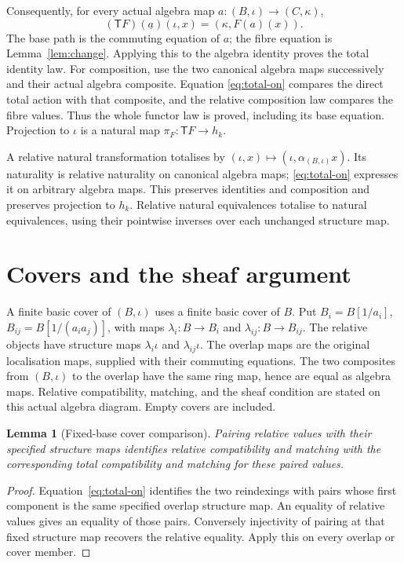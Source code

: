 \documentclass[11pt]{amsart}
\newtheorem{lemma}[theorem]{Lemma}
\theoremstyle{definition}\newtheorem{definition}[theorem]{Definition}
\begin{document}
Consequently, for every actual algebra map $a:(B,\iota)\to(C,\kappa)$,
\begin{equation}\label{eq:total-on}
 (\mathsf T F)(\underline a)(\iota,x)=(\kappa,F(a)(x)).
\end{equation}
The base path is the commuting equation of $a$; the fibre equation is
Lemma~\ref{lem:change}. Applying this to the algebra identity proves
the total identity law. For composition, use the two canonical algebra
maps successively and their actual algebra composite. Equation
\eqref{eq:total-on} compares the direct total action with that composite,
and the relative composition law compares the fibre values. Thus the
whole functor law is proved, including its base equation.
Projection to $\iota$ is a natural map $\pi_F:\mathsf T F\to h_k$.

A relative natural transformation totalises by
$(\iota,x)\mapsto(\iota,\alpha_{(B,\iota)}x)$.
Its naturality is relative naturality on canonical algebra maps;
\eqref{eq:total-on} expresses it on arbitrary algebra maps.
This preserves identities and composition and preserves projection to
$h_k$. Relative natural equivalences totalise to natural equivalences,
using their pointwise inverses over each unchanged structure map.

\section{Covers and the sheaf argument}
A finite basic cover of $(B,\iota)$ uses a finite basic cover of $B$.
Put $B_i=B[1/a_i]$, $B_{ij}=B[1/(a_i a_j)]$, with maps
$\lambda_i:B\to B_i$ and $\lambda_{ij}:B\to B_{ij}$.
The relative objects have structure maps $\lambda_i\iota$ and
$\lambda_{ij}\iota$. The overlap maps are the original localisation
maps, supplied with their commuting equations. The two composites from
$(B,\iota)$ to the overlap have the same ring map, hence are equal as
algebra maps. Relative compatibility, matching, and the sheaf condition
are stated on this actual algebra diagram. Empty covers are included.

\begin{lemma}[Fixed-base cover comparison]\label{lem:cover}
Pairing relative values with their specified structure maps identifies
relative compatibility and matching with the corresponding total
compatibility and matching for these paired values.
\end{lemma}
\begin{proof}
Equation~\eqref{eq:total-on} identifies the two reindexings with pairs
whose first component is the same specified overlap structure map.
An equality of relative values gives an equality of those pairs.
Conversely injectivity of pairing at that fixed structure map recovers
the relative equality. Apply this on every overlap or cover member.
\end{proof}
\end{document}
